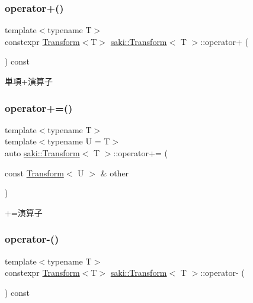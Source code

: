 \subsubsection{\texorpdfstring{operator+()}{operator+()}}
{\footnotesize\ttfamily template$<$typename T$>$ \\
constexpr \mbox{\hyperlink{classsaki_1_1_transform}{Transform}}$<$T$>$ \mbox{\hyperlink{classsaki_1_1_transform}{saki\+::\+Transform}}$<$ T $>$\+::operator+ (\begin{DoxyParamCaption}{ }\end{DoxyParamCaption}) const\hspace{0.3cm}{\ttfamily [inline]}}



単項+演算子 

\mbox{\label{classsaki_1_1_transform_ae61e16c754492653881275f3942efb29}} 
\subsubsection{\texorpdfstring{operator+=()}{operator+=()}}
{\footnotesize\ttfamily template$<$typename T$>$ \\
template$<$typename U  = T$>$ \\
auto \mbox{\hyperlink{classsaki_1_1_transform}{saki\+::\+Transform}}$<$ T $>$\+::operator+= (\begin{DoxyParamCaption}\item[{const \mbox{\hyperlink{classsaki_1_1_transform}{Transform}}$<$ U $>$ \&}]{other }\end{DoxyParamCaption})\hspace{0.3cm}{\ttfamily [inline]}}



+=演算子 

\mbox{\label{classsaki_1_1_transform_a813e5118f0a23213b21a6b7f101a4584}} 
\subsubsection{\texorpdfstring{operator-\/()}{operator-()}}
{\footnotesize\ttfamily template$<$typename T$>$ \\
constexpr \mbox{\hyperlink{classsaki_1_1_transform}{Transform}}$<$T$>$ \mbox{\hyperlink{classsaki_1_1_transform}{saki\+::\+Transform}}$<$ T $>$\+::operator-\/ (\begin{DoxyParamCaption}{ }\end{DoxyParamCaption}) const\hspace{0.3cm}{\ttfamily [inline]}}



